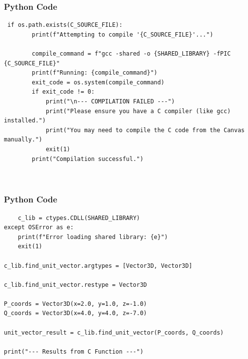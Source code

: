 \documentclass{beamer}
\begin{document}
\begin{frame}[fragile]
    \frametitle{Python Code}
    \begin{lstlisting}
 if os.path.exists(C_SOURCE_FILE):
        print(f"Attempting to compile '{C_SOURCE_FILE}'...")
        
        compile_command = f"gcc -shared -o {SHARED_LIBRARY} -fPIC {C_SOURCE_FILE}"
        print(f"Running: {compile_command}")
        exit_code = os.system(compile_command)
        if exit_code != 0:
            print("\n--- COMPILATION FAILED ---")
            print("Please ensure you have a C compiler (like gcc) installed.")
            print("You may need to compile the C code from the Canvas manually.")
            exit(1)
        print("Compilation successful.")
   
    

    \end{lstlisting}
\end{frame}
\begin{frame}[fragile]
    \frametitle{Python Code}
    \begin{lstlisting}
    c_lib = ctypes.CDLL(SHARED_LIBRARY)
except OSError as e:
    print(f"Error loading shared library: {e}")
    exit(1)

c_lib.find_unit_vector.argtypes = [Vector3D, Vector3D]

c_lib.find_unit_vector.restype = Vector3D

P_coords = Vector3D(x=2.0, y=1.0, z=-1.0)
Q_coords = Vector3D(x=4.0, y=4.0, z=-7.0)

unit_vector_result = c_lib.find_unit_vector(P_coords, Q_coords)

print("--- Results from C Function ---")
    \end{lstlisting}
\end{frame}
\end{document}
